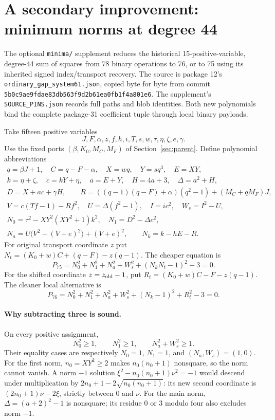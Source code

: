 \section{A secondary improvement: minimum norms at degree 44}
\label{app:minima}

The optional \texttt{minima/} supplement reduces the historical
15-positive-variable, degree-44 sum of squares from 78 binary operations
to 76, or to 75 using its inherited signed index/transport recovery.
The source is package 12's \texttt{ordinary\_gap\_system61.json}, copied
byte for byte from commit \texttt{5b0c9ae9fdae83db563f9d2b61ea0fb1f4a801e6}.
The supplement's \texttt{SOURCE\_PINS.json} records full paths and blob
identities. Both new polynomials bind the complete package-31 coefficient
tuple through local binary payloads.

Take fifteen positive variables
\[
 J,F,\alpha,z,f,h,i,T,s,w,\tau,\eta,\zeta,e,\gamma.
\]
Use the fixed ports $(\beta,K_0,M_C,M_F)$ of Section~\ref{sec:parent}.
Define polynomial abbreviations
\begin{gather*}
 q=\beta J+1,\quad C=q-F-\alpha,\quad X=wq,\quad Y=sq^3,\quad E=XY,\\
 k=\eta+\zeta,\quad c=kY+\eta,\quad a=E+Y,\quad H=4a+3,\quad
 \Delta=a^2+H,\\
 D=X+ac+\gamma H,\qquad
 R=((q-1)(q-F)+\alpha)(q^2-1)+(M_C+qM_F)J,\\
 V=c(Tf-1)-Rf^2,\quad U=\Delta(f^2-1),\quad I=ic^2,\quad W_s=I^2-U,\\
 N_0=\tau^2-XY^2(XY^2+1)k^2,\quad
 N_1=D^2-\Delta c^2,\\
 N_a=U\bigl(V^2-(V+e)^2\bigr)+(V+e)^2,\qquad N_k=k-hE-R.
\end{gather*}
For original transport coordinate $z$ put
$N_t=(K_0+w)C+(q-F)-z(q-1)$. The cheaper equation is
\[
 \boxed{P_{75}=N_0^2+N_1^2+N_a^2+W_s^2+(N_kN_t-1)^2-3=0.}
\]
For the shifted coordinate $z=z_{\rm old}-1$, put
$R_t=(K_0+w)C-F-z(q-1)$. The cleaner local alternative is
\[
 \boxed{P_{76}=N_0^2+N_1^2+N_a^2+W_s^2+(N_k-1)^2+R_t^2-3=0.}
\]

\paragraph{Why subtracting three is sound.}
On every positive assignment,
\[
 N_0^2\geq1,\qquad N_1^2\geq1,\qquad N_a^2+W_s^2\geq1.
\]
Their equality cases are respectively $N_0=1$, $N_1=1$, and
$(N_a,W_s)=(1,0)$.
For the first norm, $n_0=XY^2\geq2$ makes $n_0(n_0+1)$ nonsquare,
so the norm cannot vanish. A norm $-1$ solution
$\xi^2-n_0(n_0+1)\nu^2=-1$ would descend under multiplication by
$2n_0+1-2\sqrt{n_0(n_0+1)}$: its new second coordinate is
$(2n_0+1)\nu-2\xi$, strictly between 0 and $\nu$.
For the main norm, $\Delta=(a+2)^2-1$ is nonsquare; its residue 0 or 3
modulo four also excludes norm $-1$.

